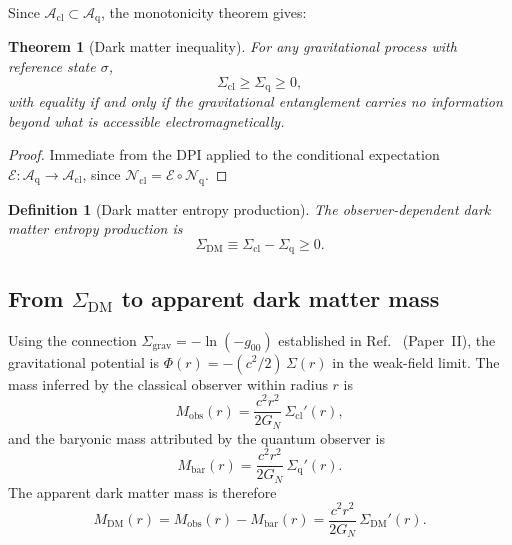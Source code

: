 \documentclass[prd,twocolumn,superscriptaddress,longbibliography,floatfix]{revtex4-2}
\newtheorem{theorem}{Theorem}
\newtheorem{definition}{Definition}
\newcommand{\chan}{\mathcal{N}}
\newcommand{\algO}{\mathcal{A}}
\begin{document}
Since $\algO_{\mathrm{cl}} \subset \algO_{\mathrm{q}}$, the
monotonicity theorem gives:

\begin{theorem}[Dark matter inequality]
\label{thm:dm}
For any gravitational process with reference state
$\sigma$,
\begin{equation}
\Sigma_{\mathrm{cl}} \geq \Sigma_{\mathrm{q}} \geq 0,
\label{eq:dm_ineq}
\end{equation}
with equality if and only if the gravitational entanglement
carries no information beyond what is accessible
electromagnetically.
\end{theorem}

\begin{proof}
Immediate from the DPI applied to the conditional expectation
$\mathcal{E}: \algO_{\mathrm{q}} \to \algO_{\mathrm{cl}}$,
since $\chan_{\mathrm{cl}} = \mathcal{E} \circ
\chan_{\mathrm{q}}$.
\end{proof}

\begin{definition}[Dark matter entropy production]
\label{def:sigma_dm}
The observer-dependent dark matter entropy production is
\begin{equation}
\Sigma_{\mathrm{DM}} \equiv \Sigma_{\mathrm{cl}} -
\Sigma_{\mathrm{q}} \geq 0.
\label{eq:sigma_dm}
\end{equation}
\end{definition}

\subsection{From $\Sigma_{\mathrm{DM}}$ to apparent dark
matter mass}

Using the connection $\Sigma_{\mathrm{grav}} = -\ln(-g_{00})$
established in Ref.~\cite{Paper2} (Paper~II), the gravitational
potential is
$\Phi(r) = -(c^2/2)\,\Sigma(r)$ in the weak-field limit.
The mass inferred by the classical observer within radius $r$
is
\begin{equation}
M_{\mathrm{obs}}(r) = \frac{c^2 r^2}{2G_N}\,
\Sigma_{\mathrm{cl}}'(r),
\label{eq:M_obs}
\end{equation}
and the baryonic mass attributed by the quantum observer is
\begin{equation}
M_{\mathrm{bar}}(r) = \frac{c^2 r^2}{2G_N}\,
\Sigma_{\mathrm{q}}'(r).
\label{eq:M_bar}
\end{equation}
The apparent dark matter mass is therefore
\begin{equation}
M_{\mathrm{DM}}(r) = M_{\mathrm{obs}}(r) - M_{\mathrm{bar}}(r)
= \frac{c^2 r^2}{2G_N}\,\Sigma_{\mathrm{DM}}'(r).
\label{eq:M_DM}
\end{equation}
\end{document}
